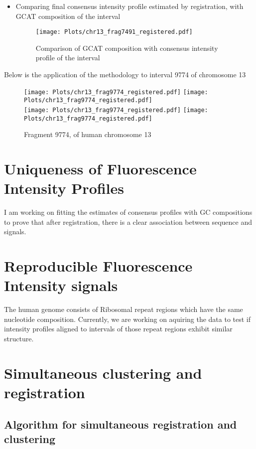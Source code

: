 \begin{itemize}
\item Comparing final consensus intensity profile estimated by registration, with GCAT composition of the interval
\begin{figure}[H]
\begin{center}
\texttt{[image: Plots/chr13\_frag7491\_registered.pdf]}
\end{center}
\caption{Comparison of GCAT composition with consensus intensity profile of the interval}
\label{fig:Frag7491_Compare}
\end{figure}
\end{itemize}

\newpage
Below is the application of the methodology to interval 9774 of chromosome 13
\begin{figure}[H]
\begin{center}
\texttt{[image: Plots/chr13\_frag9774\_registered.pdf]}
\texttt{[image: Plots/chr13\_frag9774\_registered.pdf]} \\
\texttt{[image: Plots/chr13\_frag9774\_registered.pdf]} 
\texttt{[image: Plots/chr13\_frag9774\_registered.pdf]}
\end{center}
\caption{Fragment 9774, of human chromosome 13}
\label{fig:Frag9774_All}
\end{figure}

\section{Uniqueness of Fluorescence Intensity Profiles}
\begin{tcolorbox}[colback=red!5,colframe=red!40!black,title=Work in progress] %
I am working on fitting the estimates of consensus profiles with GC compositions to prove that after registration, there is a clear association between sequence and signals. 
\end{tcolorbox}

\section{Reproducible Fluorescence Intensity signals}
\begin{tcolorbox}[colback=green!5,colframe=green!40!black,title=Work in progress] %
The human genome consists of Ribosomal repeat regions which have the same nucleotide composition. Currently, we are working on aquiring the data to test if intensity profiles aligned to intervals of those repeat regions exhibit similar structure.
\end{tcolorbox}


\section{Simultaneous clustering and registration}
\subsection{Algorithm for simultaneous registration and clustering}



